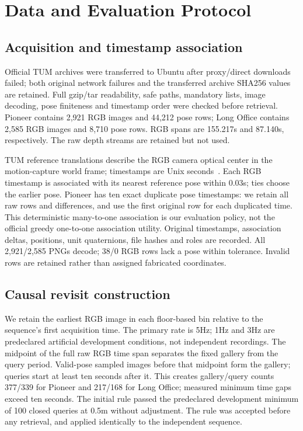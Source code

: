 \documentclass[conference,letterpaper]{IEEEtran}
\begin{document}
\section{Data and Evaluation Protocol}
\subsection{Acquisition and timestamp association}
Official TUM archives were transferred to Ubuntu after proxy/direct downloads failed; both original network failures and the transferred archive SHA256 values are retained. Full gzip/tar readability, safe paths, mandatory lists, image decoding, pose finiteness and timestamp order were checked before retrieval. Pioneer contains 2,921 RGB images and 44,212 pose rows; Long Office contains 2,585 RGB images and 8,710 pose rows. RGB spans are 155.217s and 87.140s, respectively. The raw depth streams are retained but not used.

TUM reference translations describe the RGB camera optical center in the motion-capture world frame; timestamps are Unix seconds~\cite{tumformat}. Each RGB timestamp is associated with its nearest reference pose within 0.03s; ties choose the earlier pose. Pioneer has ten exact duplicate pose timestamps: we retain all raw rows and differences, and use the first original row for each duplicated time. This deterministic many-to-one association is our evaluation policy, not the official greedy one-to-one association utility. Original timestamps, association deltas, positions, unit quaternions, file hashes and roles are recorded. All 2,921/2,585 PNGs decode; 38/0 RGB rows lack a pose within tolerance. Invalid rows are retained rather than assigned fabricated coordinates.

\subsection{Causal revisit construction}
We retain the earliest RGB image in each floor-based bin relative to the sequence's first acquisition time. The primary rate is 5Hz; 1Hz and 3Hz are predeclared artificial development conditions, not independent recordings. The midpoint of the full raw RGB time span separates the fixed gallery from the query period. Valid-pose sampled images before that midpoint form the gallery; queries start at least ten seconds after it. This creates gallery/query counts 377/339 for Pioneer and 217/168 for Long Office; measured minimum time gaps exceed ten seconds. The initial rule passed the predeclared development minimum of 100 closed queries at 0.5m without adjustment. The rule was accepted before any retrieval, and applied identically to the independent sequence.
\end{document}
